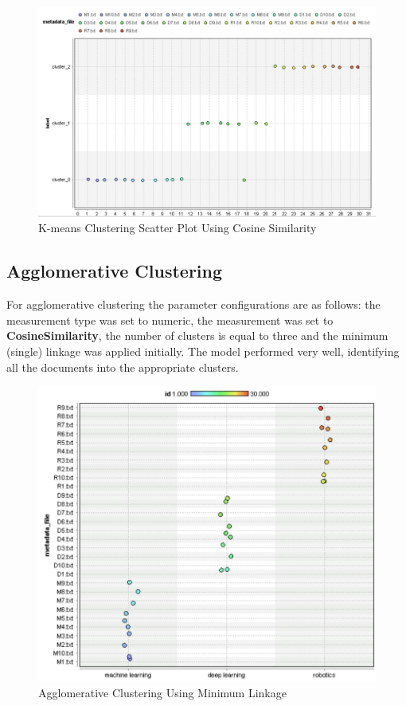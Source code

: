 \begin{figure}[ht]
	\begin{center}
		\advance\leftskip-3cm
		\advance\rightskip-3cm
		\includegraphics[keepaspectratio=true,scale=0.6]{__resources/kmeans2.JPG}
		\caption{K-means Clustering Scatter Plot Using Cosine Similarity}
		\label{stop}
	\end{center}
\end{figure} 

\subsection*{Agglomerative Clustering}
For agglomerative clustering the parameter configurations are as follows: the measurement type was set to numeric, the measurement was set to \textbf{CosineSimilarity}, the number of clusters is equal to three and the minimum (single) linkage was applied initially. The model performed very well, identifying all the documents into the appropriate clusters.

\begin{figure}[ht]
	\begin{center}
		\advance\leftskip-3cm
		\advance\rightskip-3cm
		\includegraphics[keepaspectratio=true,scale=0.7]{__resources/agg1.JPG}
		\caption{Agglomerative Clustering Using Minimum Linkage}
		\label{stop}
	\end{center}
\end{figure} 
\newpage

